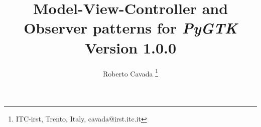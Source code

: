 \documentclass{article}
\newcommand{\appl}[1]{\textsl{#1}\xspace}
\newcommand{\pygtk}{\appl{PyGTK}}
\begin{document}
\title{Model-View-Controller and Observer patterns for \pygtk \\
Version 1.0.0}

\author{ Roberto Cavada \thanks{ITC-irst, Trento, Italy,
 cavada@irst.itc.it} }

\maketitle













\end{document}
